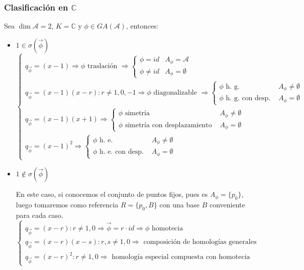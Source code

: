 \documentclass[10pt,a4paper,openright]{book}
\theoremstyle{break}
\begin{document}
\subsubsection{Clasificación en $\mathbb{C}$}
Sea $\dim \mathcal{A} = 2$, $K = \mathbb{C}$ y $\phi \in GA(\mathcal{A})$, entonces:
\begin{itemize}
\item $\boxed{1 \in \sigma(\vec{\phi})}$
$$\begin{cases} q_{\vec{\phi}} = (x - 1) \Rightarrow \phi \mbox{ traslación } \Rightarrow \begin{cases} \phi = id & A_\phi = \mathcal{A} \\ \phi \neq id & A_\phi = \emptyset \end{cases} \\ q_{\vec{\phi}} = (x-1)(x-r) : r \neq 1,0,-1 \Rightarrow \phi \mbox{ diagonalizable } \Rightarrow \begin{cases} \phi \mbox{ h. g. } & A_\phi \neq \emptyset \\ \phi \mbox{ h. g. con desp. } & A_\phi = \emptyset \end{cases} \\ q_{\vec{\phi}} = (x-1)(x+1) \Rightarrow \begin{cases} \phi \mbox{ simetría } & A_\phi \neq \emptyset \\  \phi \mbox{ simetría con desplazamiento } & A_\phi = \emptyset\end{cases} \\ q_{\vec{\phi}} = (x-1)^2  \Rightarrow \begin{cases} \phi \mbox{ h. e. } & A_\phi \neq \emptyset \\ \phi \mbox{ h. e. con desp. } & A_\phi = \emptyset   \end{cases} \end{cases}$$

\item $\boxed{1 \notin \sigma(\vec{\phi})}$

En este caso, si conocemos el conjunto de puntos fijos, pues es $A_\phi = \{ p_0\}$, luego tomaremos como referencia $R=\{p_0, B\}$ con una base $B$ conveniente para cada caso.
$$\begin{cases} q_{\vec{\phi}} = (x - r) : r \neq 1,0 \Rightarrow \vec{\phi} = r \cdot id \Rightarrow \phi \mbox{ homotecia } \\  q_{\vec{\phi}} = (x - r)(x-s) : r,s \neq 1,0 \Rightarrow \mbox{ composición de homologías generales } \\ q_{\vec{\phi}} = (x - r)^2 : r \neq 1,0 \Rightarrow \mbox{ homología especial compuesta con homotecia } \end{cases}$$


\end{itemize}
\end{document}

